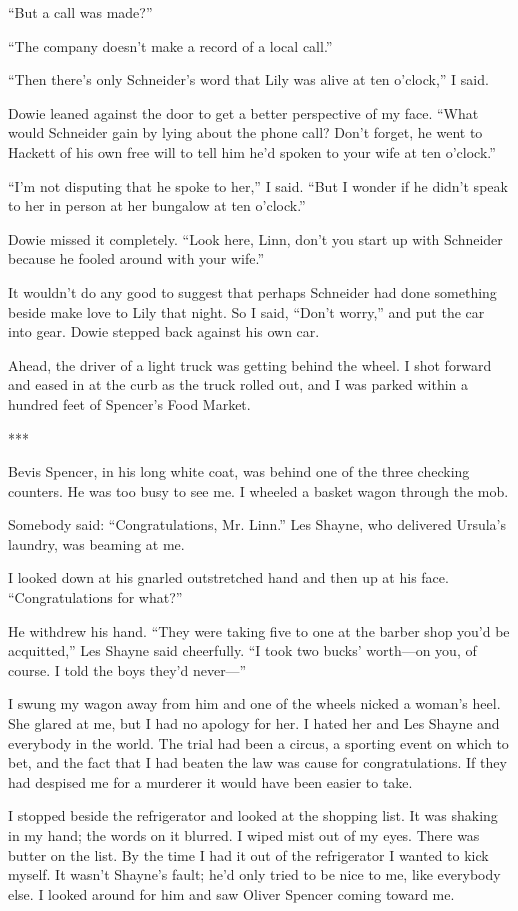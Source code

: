 {“But a call was made?”

“The company doesn’t make a record of a local call.”

“Then there’s only Schneider’s word that Lily was alive at ten o’clock,” I said.

Dowie leaned against the door to get a better perspective of my face. “What would Schneider gain by lying about the phone call? Don’t forget, he went to Hackett of his own free will to tell him he’d spoken to your wife at ten o’clock.”

“I’m not disputing that he spoke to her,” I said. “But I wonder if he didn’t speak to her in person at her bungalow at ten o’clock.”

Dowie missed it completely. “Look here, Linn, don’t you start up with Schneider because he fooled around with your wife.”

It wouldn’t do any good to suggest that perhaps Schneider had done something beside make love to Lily that night. So I said, “Don’t worry,” and put the car into gear. Dowie stepped back against his own car.

Ahead, the driver of a light truck was getting behind the wheel. I shot forward and eased in at the curb as the truck rolled out, and I was parked within a hundred feet of Spencer’s Food Market.

***

Bevis Spencer, in his long white coat, was behind one of the three checking counters. He was too busy to see me. I wheeled a basket wagon through the mob.

Somebody said: “Congratulations, Mr. Linn.” Les Shayne, who delivered Ursula’s laundry, was beaming at me.

I looked down at his gnarled outstretched hand and then up at his face. “Congratulations for what?”

He withdrew his hand. “They were taking five to one at the barber shop you’d be acquitted,” Les Shayne said cheerfully. “I took two bucks’ worth—on you, of course. I told the boys they’d never—”

I swung my wagon away from him and one of the wheels nicked a woman’s heel. She glared at me, but I had no apology for her. I hated her and Les Shayne and everybody in the world. The trial had been a circus, a sporting event on which to bet, and the fact that I had beaten the law was cause for congratulations. If they had despised me for a murderer it would have been easier to take.

I stopped beside the refrigerator and looked at the shopping list. It was shaking in my hand; the words on it blurred. I wiped mist out of my eyes. There was butter on the list. By the time I had it out of the refrigerator I wanted to kick myself. It wasn’t Shayne’s fault; he’d only tried to be nice to me, like everybody else. I looked around for him and saw Oliver Spencer coming toward me.

}
